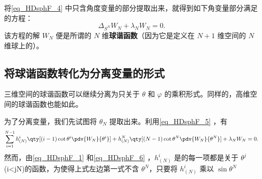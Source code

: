 将\autoref{eq_HDsphF_4} 中只含角度变量的部分提取出来，就得到如下角变量部分满足的方程：
\begin{equation}
\Delta_{S^N}W_N+\lambda_N W_N=0.~
\end{equation}
该方程的解 $W_N$ 便是所谓的 $N$ 维\textbf{球谐函数}（因为它是定义在 $N+1$ 维空间的 $N$ 维球上的）。

\subsection{将球谐函数转化为分离变量的形式}
三维空间的球谐函数可以继续分离为只关于 $\theta$ 和 $\varphi$ 的乘积形式。同样的，高维空间的球谐函数也能如此。

为了分离变量，我们先试图将 $\theta_N$ 提取出来。利用\autoref{eq_HDsphF_5} ，有
\begin{equation}
\sum_{i=1}^{N-1} h^{i}_{(N)}\qty[(i-1)\cot\theta^i\pdv{W_N}{\theta^i}]+h^{N}_{(N)}\qty[(N-1)\cot\theta^N\pdv{W_N}{\theta^N}]+\lambda_N W_N=0.~
\end{equation}
然而，由\autoref{eq_HDsphF_1} 和\autoref{eq_HDsphF_6} ，$h^i_{(N)}$ 是的每一项都是关于 $\theta^j$ (i<j\leq N)的函数，为使得上式左边第一式不含 $\theta^N$，只要将 $h^i_{(N)}$ 乘以 $\sin\theta^N$










